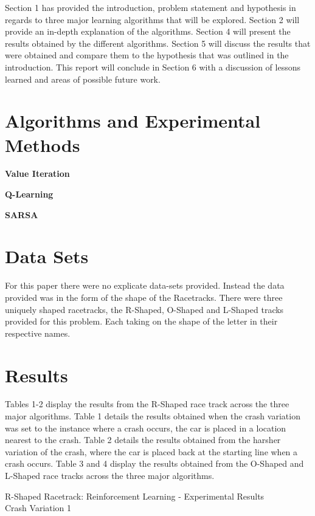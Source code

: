 \documentclass[twoside,11pt]{article}
\begin{document}
\hspace*{10mm} Section 1 has provided the introduction, problem statement and hypothesis in regards to three major learning algorithms that will be explored. Section 2 will provide an in-depth explanation of the algorithms. Section 4 will present the results obtained by the different algorithms. Section 5 will discuss the results that were obtained and compare them to the hypothesis that was outlined in the introduction. This report will conclude in Section 6 with a discussion of lessons learned and areas of possible future work.\\


\section{Algorithms and Experimental Methods}
\textbf{Value Iteration}
\newpage

\textbf{Q-Learning}
\newpage

\textbf{SARSA}
\newpage


\section{Data Sets}
\hspace*{10mm} For this paper there were no explicate data-sets provided. Instead the data provided was in the form of the shape of the Racetracks. There were three uniquely shaped racetracks, the R-Shaped, O-Shaped and L-Shaped tracks provided for this problem. Each taking on the shape of the letter in their respective names.\\
	
\section{Results}
\hspace*{10mm} Tables 1-2 display the results from the R-Shaped race track across the three major algorithms. Table 1 details the results obtained when the crash variation was set to the instance where a crash occurs, the car is placed in a location nearest to the crash. Table 2 details the results obtained from the harsher variation of the crash, where the car is placed back at the starting line when a crash occurs. Table 3 and 4 display the results obtained from the O-Shaped and L-Shaped race tracks across the three major algorithms.\newline

\begin{table}[h]
		\centering
		\caption{R-Shaped Racetrack: Reinforcement Learning - Experimental Results\\ Crash Variation 1}
		\label{tab:table1}
\end{table}
\end{document}
